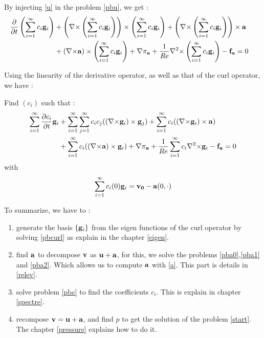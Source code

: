 By injecting \ref{u} in the problem \ref{pbu}, we get :
\begin{align*}
\frac{\partial}{\partial t}\left(\sum_{i=1}^\infty c_i{\mathbf{g}}_i\right) &+ \left({\nabla\times} \left(\sum_{i=1}^\infty c_i{\mathbf{g}}_i\right)\right)\times \left(\sum_{i=1}^\infty c_i{\mathbf{g}}_i\right) + \left({\nabla\times} \left(\sum_{i=1}^\infty c_i{\mathbf{g}}_i\right)\right)\times {\mathbf{a}}&\\
&+ ({\nabla\times} {\mathbf{a}})\times \left(\sum_{i=1}^\infty c_i{\mathbf{g}}_i\right) + {\nabla} \pi_{{\mathbf{a}}} +\frac{1}{Re}{\nabla^2\times}  \left(\sum_{i=1}^\infty c_i{\mathbf{g}}_i\right) - {\mathbf{f_a}} =0\\
\end{align*}

Using the linearity of the derivative operator, as well as that of the curl operator, we have :
\begin{pb}\label{pbc}
Find $(c_i)$ such that :
\begin{align*}
\sum_{i=1}^\infty\frac{\partial c_i}{\partial t}{\mathbf{g}}_i &+ \sum_{i=1}^\infty\sum_{j=1}^\infty c_i c_j(({\nabla\times}{\mathbf{g}}_i)\times {\mathbf{g}}_j) + \sum_{i=1}^\infty c_i(({\nabla\times}{\mathbf{g}}_i)\times {\mathbf{a}})\\
& + \sum_{i=1}^\infty c_i(({\nabla\times}{\mathbf{a}})\times {\mathbf{g}}_i) + {\nabla} \pi_{{\mathbf{a}}} +\frac{1}{Re}\sum_{i=1}^\infty c_i{\nabla^2\times}{\mathbf{g}}_i - {\mathbf{f_a}} = 0\\
\end{align*}
with \[ \sum_{i=1}^\infty c_i(0){\mathbf{g}}_i = {\mathbf{v_0}}-{\mathbf{a}}(0,\cdot) \]
\end{pb}

To summarize, we have to :
\begin{enumerate}
\item generate the basis $\{{\mathbf{g}}_i\}$ from the eigen functions of the curl operator by solving \ref{pbcurl} as explain in the chapter \ref{eigen}.
\item find ${\mathbf{a}}$ to decompose ${\mathbf{v}}$ as ${\mathbf{u}}+{\mathbf{a}}$, for this, we solve the problems \ref{pba0},\ref{pba1} and \ref{pba2}. Which allows us to compute ${\mathbf{a}}$ with \ref{a}. This part is details in \ref{relev}.
\item solve problem \ref{pbc} to find the coefficients $c_i$. This is explain in chapter \ref{spectre}.
\item recompose ${\mathbf{v}}={\mathbf{u}}+{\mathbf{a}}$, and find $p$ to get the solution of the problem \ref{start}. The chapter \ref{pressure} explains how to do it.
\end{enumerate}

